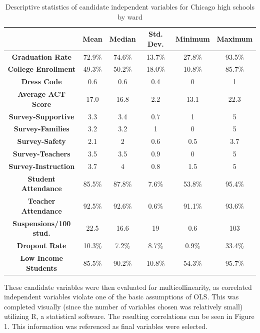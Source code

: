\documentclass[12pt]{article}
\begin{document}
\begin{center}
	\begin{table}[h]
		\begin{tabular}{ c | c | c | c | c | c }
			
			& \textbf{Mean} & \textbf{Median} & \textbf{Std. Dev.} & \textbf{Minimum} & \textbf{Maximum} \\ 
			\hline
			\textbf{Graduation Rate} & 72.9\% & 74.6\% & 13.7\% & 27.8\% & 93.5\% \\
			\textbf{College Enrollment} & 49.3\% & 50.2\% & 18.0\% & 10.8\% & 85.7\% \\
			\textbf{Dress Code} & 0.6 & 0.6 & 0.4 & 0 & 1\\
			\textbf{Average ACT Score} & 17.0 & 16.8 & 2.2 & 13.1 & 22.3\\
			\textbf{Survey-Supportive} & 3.3 & 3.4 & 0.7 & 1 & 5\\
			\textbf{Survey-Families} & 3.2 & 3.2 & 1 & 0 & 5\\
			\textbf{Survey-Safety} & 2.1 & 2 & 0.6 & 0.5 & 3.7\\
			\textbf{Survey-Teachers} & 3.5 & 3.5 & 0.9 & 0 & 5\\
			\textbf{Survey-Instruction} & 3.7 & 4 & 0.8 & 1.5 & 5\\
			\textbf{Student Attendance} & 85.5\% & 87.8\% & 7.6\% & 53.8\% & 95.4\% \\
			\textbf{Teacher Attendance} & 92.5\% & 92.6\% & 0.6\% & 91.1\% & 93.6\% \\
			\textbf{Suspensions/100 stud.} & 22.5 & 16.6 & 19 & 0.6 & 103\\
			\textbf{Dropout Rate} & 10.3\% & 7.2\% & 8.7\% & 0.9\% & 33.4\% \\
			\textbf{Low Income Students} & 85.5\% & 90.2\% & 10.8\% & 54.3\% & 95.7\% 
			
		\end{tabular}
		\caption{Descriptive statistics of candidate independent variables for Chicago high schools by ward}
	\end{table}
\end{center}

These candidate variables were then evaluated for multicollinearity, as correlated independent variables violate one of the basic assumptions of OLS.  This was completed visually (since the number of variables chosen was relatively small) utilizing R, a statistical software.  The resulting correlations can be seen in Figure 1.  This information was referenced as final variables were selected.
\end{document}
